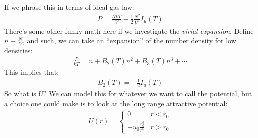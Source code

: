 \documentclass{article}
\begin{document}
If we phrase this in terms of ideal gas law:
\begin{align*}
  P = \frac{NkT}{V} - \frac{1}{2}\frac{N^2}{V^2}I_u(T)
\end{align*}
There's some other funky math here if we investigate the \textit{virial expansion}. Define $n \equiv \frac{N}{V}$, and such, we can take an ``expansion'' of the number density for low densities:
\begin{align*}
  \frac{P}{kT} = n + B_2(T)n^2 + B_3(T)n^3 + \cdots
\end{align*}
This implies that:
\begin{align*}
  B_2(T) = - \frac{1}{2}I_u(T)
\end{align*}
So what is $U$? We can model this for whatever we want to call the potential, but a choice one could make is to look at the long range attractive potential:
\begin{align*}
  U(r) = \begin{cases}
    0 & r < r_0 \\
    -u_0 \frac{r_0^6}{r^6} & r > r_0
  \end{cases}
\end{align*}
\end{document}
